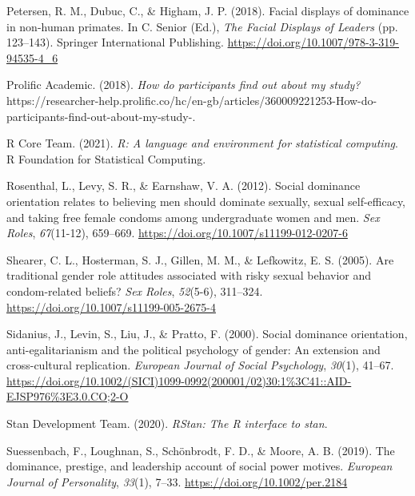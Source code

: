 \documentclass[
  donotrepeattitle,doc, 12pt, a4paper,floatsintext]{apa7}
\newlength{\cslhangindent}
\newlength{\cslentryspacingunit} %
\newenvironment{CSLReferences}[2] %
 {%
  \setlength{\parindent}{0pt}
  \ifodd #1
  \let\oldpar\par
  \def\par{\hangindent=\cslhangindent\oldpar}
  \fi
  \setlength{\parskip}{#2\cslentryspacingunit}
 }%
 {}
\begin{document}
\begin{CSLReferences}{1}{0}
\leavevmode{}%
Petersen, R. M., Dubuc, C., \& Higham, J. P. (2018). Facial displays of dominance in non-human primates. In C. Senior (Ed.), \emph{The {Facial Displays} of {Leaders}} (pp. 123--143). {Springer International Publishing}. \url{https://doi.org/10.1007/978-3-319-94535-4_6}

\leavevmode{}%
Prolific Academic. (2018). \emph{How do participants find out about my study?} https://researcher-help.prolific.co/hc/en-gb/articles/360009221253-How-do-participants-find-out-about-my-study-.

\leavevmode{}%
R Core Team. (2021). \emph{R: {A} language and environment for statistical computing}. R Foundation for Statistical Computing.

\leavevmode{}%
Rosenthal, L., Levy, S. R., \& Earnshaw, V. A. (2012). Social dominance orientation relates to believing men should dominate sexually, sexual self-efficacy, and taking free female condoms among undergraduate women and men. \emph{Sex Roles}, \emph{67}(11-12), 659--669. \url{https://doi.org/10.1007/s11199-012-0207-6}

\leavevmode{}%
Shearer, C. L., Hosterman, S. J., Gillen, M. M., \& Lefkowitz, E. S. (2005). Are traditional gender role attitudes associated with risky sexual behavior and condom-related beliefs? \emph{Sex Roles}, \emph{52}(5-6), 311--324. \url{https://doi.org/10.1007/s11199-005-2675-4}

\leavevmode{}%
Sidanius, J., Levin, S., Liu, J., \& Pratto, F. (2000). Social dominance orientation, anti-egalitarianism and the political psychology of gender: An extension and cross-cultural replication. \emph{European Journal of Social Psychology}, \emph{30}(1), 41--67. \url{https://doi.org/10.1002/(SICI)1099-0992(200001/02)30:1\%3C41::AID-EJSP976\%3E3.0.CO;2-O}

\leavevmode{}%
Stan Development Team. (2020). \emph{{RStan}: The {R} interface to stan}.

\leavevmode{}%
Suessenbach, F., Loughnan, S., Schönbrodt, F. D., \& Moore, A. B. (2019). The dominance, prestige, and leadership account of social power motives. \emph{European Journal of Personality}, \emph{33}(1), 7--33. \url{https://doi.org/10.1002/per.2184}


\end{CSLReferences}
\end{document}
